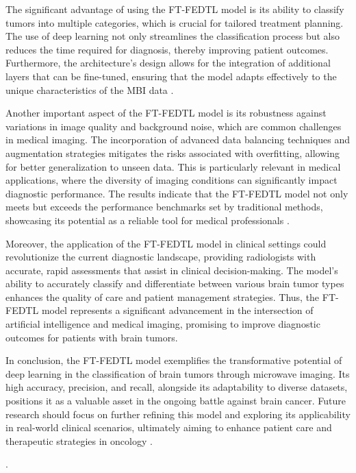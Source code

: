 \documentclass[runningheads]{llncs}
\begin{document}
The significant advantage of using the FT-FEDTL model is its ability to classify tumors into multiple categories, which is crucial for tailored treatment planning. The use of deep learning not only streamlines the classification process but also reduces the time required for diagnosis, thereby improving patient outcomes. Furthermore, the architecture's design allows for the integration of additional layers that can be fine-tuned, ensuring that the model adapts effectively to the unique characteristics of the MBI data \cite{Vivian_2024}.

Another important aspect of the FT-FEDTL model is its robustness against variations in image quality and background noise, which are common challenges in medical imaging. The incorporation of advanced data balancing techniques and augmentation strategies mitigates the risks associated with overfitting, allowing for better generalization to unseen data. This is particularly relevant in medical applications, where the diversity of imaging conditions can significantly impact diagnostic performance. The results indicate that the FT-FEDTL model not only meets but exceeds the performance benchmarks set by traditional methods, showcasing its potential as a reliable tool for medical professionals \cite{Amran_2024}.

Moreover, the application of the FT-FEDTL model in clinical settings could revolutionize the current diagnostic landscape, providing radiologists with accurate, rapid assessments that assist in clinical decision-making. The model's ability to accurately classify and differentiate between various brain tumor types enhances the quality of care and patient management strategies. Thus, the FT-FEDTL model represents a significant advancement in the intersection of artificial intelligence and medical imaging, promising to improve diagnostic outcomes for patients with brain tumors.

In conclusion, the FT-FEDTL model exemplifies the transformative potential of deep learning in the classification of brain tumors through microwave imaging. Its high accuracy, precision, and recall, alongside its adaptability to diverse datasets, positions it as a valuable asset in the ongoing battle against brain cancer. Future research should focus on further refining this model and exploring its applicability in real-world clinical scenarios, ultimately aiming to enhance patient care and therapeutic strategies in oncology \cite{Vivian_2024}.

.
\end{document}
